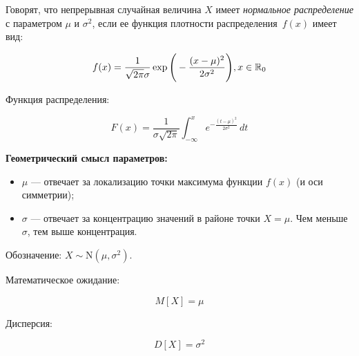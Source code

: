 Говорят, что  непрерывная случайная величина $X$ имеет \textit{нормальное распределение} с параметром $\mu$ и $\sigma^2$, если ее функция плотности распределения~$f(x)$ имеет вид:

\begin{equation}
	f(x) = \frac{1}{\sqrt{2\pi} \sigma} \exp\Bigg( -\frac{(x - \mu)^2}{2\sigma^2} \Bigg), \space x \in \mathbb{R}_0
\end{equation}

Функция распределения: 

\begin{equation}
	F(x) = \frac{1}{\sigma \sqrt{2\pi}} \int_{-\infty}^{x} e^{ -\frac{(t - \mu)^2}{2\sigma^2} } \, dt
\end{equation}

\textbf{Геометрический смысл параметров:}

\begin{itemize}
	\item  $\mu$ --- отвечает за локализацию точки максимума функции $f(x)$ (и оси симметрии);
	
	\item $\sigma$ --- отвечает за концентрацию значений в районе точки $X=\mu$. Чем меньше $\sigma$, тем выше концентрация.
\end{itemize}

Обозначение: $X \sim \mathrm{N}(\mu, \sigma^2)$.

Математическое ожидание:

\begin{equation}
	M[X] = \mu
\end{equation}

Дисперсия: 

\begin{equation}
	D[X] = \sigma^2
\end{equation}